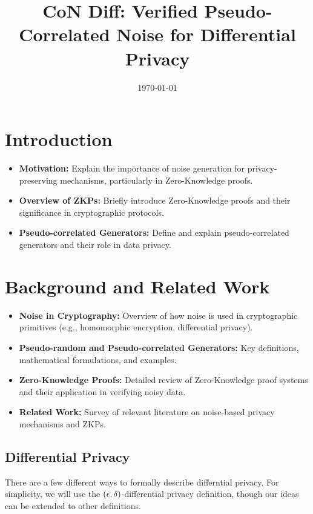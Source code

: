 \documentclass[11pt]{article}
\newcommand{\myname}{Lev Stambler}
\begin{document}
\title{CoN Diff: Verified Pseudo-Correlated Noise for Differential Privacy}


\date{\today}
\maketitle




\section{Introduction}
\begin{itemize}
    \item \textbf{Motivation:} Explain the importance of noise generation for privacy-preserving mechanisms, particularly in Zero-Knowledge proofs.
    \item \textbf{Overview of ZKPs:} Briefly introduce Zero-Knowledge proofs and their significance in cryptographic protocols.
    \item \textbf{Pseudo-correlated Generators:} Define and explain pseudo-correlated generators and their role in data privacy.
\end{itemize}

\section{Background and Related Work}
\begin{itemize}
    \item \textbf{Noise in Cryptography:} Overview of how noise is used in cryptographic primitives (e.g., homomorphic encryption, differential privacy).
    \item \textbf{Pseudo-random and Pseudo-correlated Generators:} Key definitions, mathematical formulations, and examples.
    \item \textbf{Zero-Knowledge Proofs:} Detailed review of Zero-Knowledge proof systems and their application in verifying noisy data.
    \item \textbf{Related Work:} Survey of relevant literature on noise-based privacy mechanisms and ZKPs.
\end{itemize}

\subsection{Differential Privacy}
There are a few different ways to formally describe differntial privacy.
For simplicity, we will use the $(\epsilon, \delta)$-differential privacy definition, though our ideas can be extended to other definitions.
\end{document}
